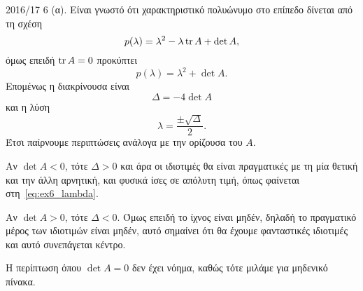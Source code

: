 \begin{solution}{2016/17 6}
    (α). Είναι γνωστό ότι χαρακτηριστικό πολυώνυμο στο επίπεδο δίνεται από τη
    σχέση
    \[
        p(\lambda) = \lambda^2 - \lambda\operatorname{tr}{A}+ \det{A},
    \]
    όμως επειδή \( \operatorname{tr}{A} = 0 \) προκύπτει
    \[
        p(\lambda) = \lambda^2 + \det{A}.
    \]
    Επομένως η διακρίνουσα είναι
    \[
        \Delta = -4\det{A}
    \]
    και η λύση
    \begin{equation}\label{eq:ex6_lambda}
        \lambda = \frac{\pm \sqrt{\Delta}}{2}.
    \end{equation}
    Έτσι παίρνουμε περιπτώσεις ανάλογα με την ορίζουσα του \( A \).

    Αν \( \det{A} < 0 \), τότε \( \Delta > 0 \) και άρα οι ιδιοτιμές θα είναι
    πραγματικές με τη μία θετική και την άλλη αρνητική, και φυσικά ίσες σε
    απόλυτη τιμή, όπως φαίνεται στη~\eqref{eq:ex6_lambda}.

    Αν \( \det{A} > 0 \), τότε \( \Delta < 0 \). Όμως επειδή το ίχνος είναι
    μηδέν, δηλαδή το πραγματικό μέρος των ιδιοτιμών είναι μηδέν, αυτό σημαίνει
    ότι θα έχουμε φανταστικές ιδιοτιμές και αυτό συνεπάγεται κέντρο.

    Η περίπτωση όπου \( \det{A} = 0\) δεν έχει νόημα, καθώς τότε μιλάμε για
    μηδενικό πίνακα.


\end{solution}
